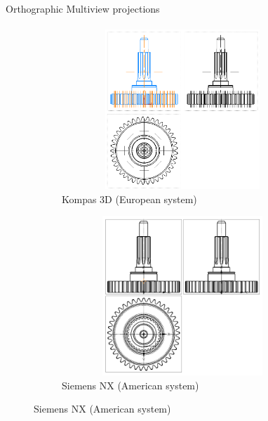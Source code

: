 \documentclass[aspectratio=169]{beamer}
\begin{document}
\begin{frame}[t]{Orthographic Multiview projections}
    \framesubtitle{}
    \vspace{-0.6cm}
    \begin{figure}[H]
        \begin{subfigure}{0.49\textwidth}
            \centering\includegraphics[height=6cm,width=1\textwidth,keepaspectratio]{resources/kompas_2.png}
            \caption*{Kompas 3D (European system)}
            \label{fig:resources/kompas_2.png}
        \end{subfigure}
        \begin{subfigure}{0.49\textwidth}
            \centering\includegraphics[height=6cm,width=1\textwidth,keepaspectratio]{resources/nx_2.png}
            \caption*{Siemens NX (American system)}
            \label{fig:resources/nx_2.png}
        \end{subfigure}
    \end{figure}
\end{frame}
\end{document}
